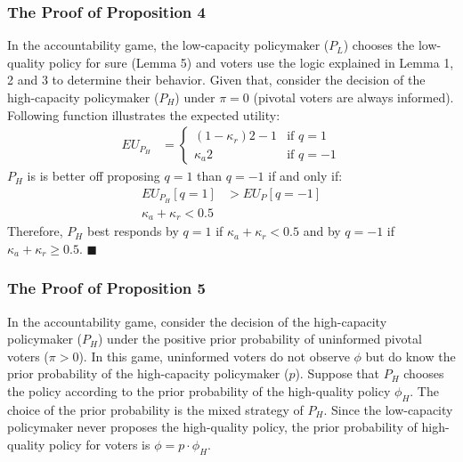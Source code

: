 \subsubsection{The Proof of Proposition 4}

\par In the accountability game, the low-capacity policymaker ($P_L$) chooses the low-quality policy for sure (Lemma 5) and voters use the logic explained in Lemma 1, 2 and 3 to determine their behavior. Given that, consider the decision of the high-capacity policymaker ($P_H$) under $\pi=0$ (pivotal voters are always informed). Following function illustrates the expected utility:
\begin{align*}
EU_{P_H} &= 
\begin{cases}
(1-\kappa_{r}) 2 - 1  & \text{if $q=1$} \\
\kappa_{a} 2  & \text{if $q=-1$} 
\end{cases} 
\end{align*}
$P_H$ is is better off proposing $q=1$ than $q=-1$ if and only if:
\begin{align*}
EU_{P_H}[q=1] &> EU_P[q=-1] \\
\kappa_{a} + \kappa_{r} < 0.5
\end{align*}
Therefore, $P_H$ best responds by $q=1$ if $\kappa_{a} + \kappa_{r} < 0.5$ and by $q=-1$ if $\kappa_{a} + \kappa_{r} \geq 0.5$. 
\hfill $\blacksquare$

\subsubsection{The Proof of Proposition 5}

\par In the accountability game, consider the decision of the high-capacity policymaker ($P_H$) under the positive prior probability of uninformed pivotal voters ($\pi>0$). In this game, uninformed voters do not observe $\phi$ but do know the prior probability of the high-capacity policymaker ($p$). Suppose that $P_H$ chooses the policy according to the prior probability of the high-quality policy $\phi_H$. The choice of the prior probability is the mixed strategy of $P_H$. Since the low-capacity policymaker never proposes the high-quality policy, the prior probability of high-quality policy for voters is $\phi = p \cdot \phi_H$. 

